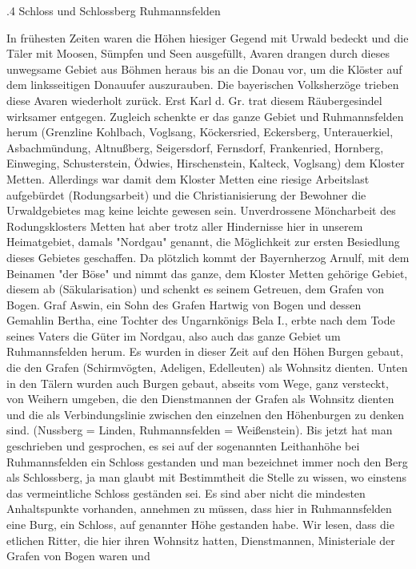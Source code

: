 \documentclass{book}
\begin{document}
.4 Schloss und Schlossberg Ruhmannsfelden

In frühesten Zeiten waren die Höhen hiesiger Gegend mit Urwald bedeckt und die
Täler mit Moosen, Sümpfen und Seen ausgefüllt, Avaren drangen durch dieses
unwegsame Gebiet aus Böhmen heraus bis an die Donau vor, um die Klöster auf dem
linksseitigen Donauufer auszurauben. Die bayerischen Volksherzöge trieben diese
Avaren wiederholt zurück. Erst Karl d. Gr. trat diesem Räubergesindel wirksamer
entgegen. Zugleich schenkte er das ganze Gebiet und Ruhmannsfelden herum
(Grenzline Kohlbach, Voglsang, Köckersried, Eckersberg, Unterauerkiel,
Asbachmündung, Altnußberg, Seigersdorf, Fernsdorf, Frankenried, Hornberg,
Einweging, Schusterstein, Ödwies, Hirschenstein, Kalteck, Voglsang) dem Kloster
Metten. Allerdings war damit dem Kloster Metten eine riesige Arbeitslast
aufgebürdet (Rodungsarbeit) und die Christianisierung der Bewohner die
Urwaldgebietes mag keine leichte gewesen sein. Unverdrossene Möncharbeit des
Rodungsklosters Metten hat aber trotz aller Hindernisse hier in unserem
Heimatgebiet, damals "Nordgau" genannt, die Möglichkeit zur ersten Besiedlung
dieses Gebietes geschaffen. Da plötzlich kommt der Bayernherzog Arnulf, mit dem
Beinamen "der Böse" und nimmt das ganze, dem Kloster Metten gehörige Gebiet,
diesem ab (Säkularisation) und schenkt es seinem Getreuen, dem Grafen von Bogen.
Graf Aswin, ein Sohn des Grafen Hartwig von Bogen und dessen Gemahlin Bertha,
eine Tochter des Ungarnkönigs Bela I., erbte nach dem Tode seines Vaters die
Güter im Nordgau, also auch das ganze Gebiet um Ruhmannsfelden herum. Es wurden
in dieser Zeit auf den Höhen Burgen gebaut, die den Grafen (Schirmvögten,
Adeligen, Edelleuten) als Wohnsitz dienten. Unten in den Tälern wurden auch
Burgen gebaut, abseits vom Wege, ganz versteckt, von Weihern umgeben, die den
Dienstmannen der Grafen als Wohnsitz dienten und die als Verbindungslinie
zwischen den einzelnen den Höhenburgen zu denken sind. (Nussberg = Linden,
Ruhmannsfelden = Weißenstein). Bis jetzt hat man geschrieben und gesprochen, es
sei auf der sogenannten Leithanhöhe bei Ruhmannsfelden ein Schloss gestanden und
man bezeichnet immer noch den Berg als Schlossberg, ja man glaubt mit
Bestimmtheit die Stelle zu wissen, wo einstens das vermeintliche Schloss
geständen sei. Es sind aber nicht die mindesten Anhaltspunkte vorhanden,
annehmen zu müssen, dass hier in Ruhmannsfelden eine Burg, ein Schloss, auf
genannter Höhe gestanden habe. Wir lesen, dass die etlichen Ritter, die hier
ihren Wohnsitz hatten, Dienstmannen, Ministeriale der Grafen von Bogen waren und
\end{document}
